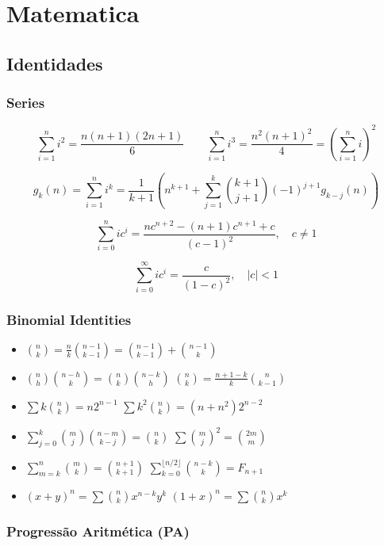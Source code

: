 \section{Matematica}

\subsection{Identidades}

\subsubsection{Series}

$$\sum_{i=1}^{n} i^{2} = \frac{n(n+1)(2n+1)}{6}  \qquad  \sum_{i=1}^{n} i^{3} = \frac{n^{2}(n+1)^{2}}{4} = \left(\sum_{i=1}^n i\right)^2$$

$$ g_k(n) = \sum_{i=1}^n i^k = \frac{1}{k+1} \left( n^{k+1} + \sum_{j=1}^k \binom{k+1}{j+1} (-1)^{j+1} g_{k-j}(n) \right) $$

$$\sum_{i=0}^{n} ic^{i} = \frac{nc^{n+2} - (n+1)c^{n+1} + c}{(c-1)^{2}}, \quad c \neq 1$$

$$\sum_{i=0}^{\infty} ic^{i} = \frac{c}{(1-c)^{2}}, \quad |c| < 1$$

\subsubsection{Binomial Identities}

\begin{itemize}[leftmargin=*, nosep]
    \item $\binom{n}{k} = \frac{n}{k}\binom{n-1}{k-1} = \binom{n-1}{k-1} + \binom{n-1}{k}$
    \item $\binom{n}{h}\binom{n-h}{k} = \binom{n}{k}\binom{n-k}{h}$ \hfill $\binom{n}{k} = \frac{n+1-k}{k} \binom{n}{k-1}$
    \item $\sum k \binom{n}{k} = n 2^{n-1}$ \hfill $\sum k^2 \binom{n}{k} = (n+n^2)2^{n-2}$
    \item $\sum_{j=0}^k \binom{m}{j}\binom{n-m}{k-j} = \binom{n}{k}$ \hfill $\sum \binom{m}{j}^2 = \binom{2m}{m}$
    \item $\sum_{m=k}^n \binom{m}{k} = \binom{n+1}{k+1}$ \hfill $\sum_{k=0}^{\lfloor n/2 \rfloor} \binom{n-k}{k} = F_{n+1}$
    \item $(x+y)^n = \sum \binom{n}{k}x^{n-k}y^k$ \hfill $(1+x)^n = \sum \binom{n}{k}x^k$
\end{itemize}


\subsubsection{Progressão Aritmética (PA)}

